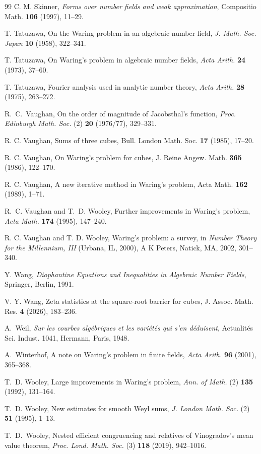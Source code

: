 \documentclass[11pt,letterpaper]{article}
\theoremstyle{definition}
\numberwithin{equation}{section}
\begin{document}
\begin{thebibliography}{99}
C. M. Skinner, \emph{Forms over number fields and weak approximation}, Compositio Math. \textbf{106} (1997), 11--29.

T. Tatuzawa, On the Waring problem in an algebraic number field,
\emph{J. Math. Soc. Japan} \textbf{10} (1958), 322--341.

T. Tatuzawa, On Waring's problem in algebraic number fields,
\emph{Acta Arith.} \textbf{24} (1973), 37--60.

T. Tatuzawa, Fourier analysis used in analytic number theory,
\emph{Acta Arith.} \textbf{28} (1975), 263--272.

R.~C.~Vaughan, On the order of magnitude of Jacobsthal's function,
\emph{Proc. Edinburgh Math. Soc.} (2) \textbf{20} (1976/77), 329--331.

R. C. Vaughan, Sums of three cubes, Bull. London Math. Soc. \textbf{17} (1985), 17--20.

R. C. Vaughan, On Waring's problem for cubes, J. Reine Angew. Math. \textbf{365} (1986), 122--170.

R. C. Vaughan, A new iterative method in Waring's problem, Acta Math. \textbf{162} (1989), 1--71.

R.~C. Vaughan and T.~D. Wooley, Further improvements in Waring's problem,
\emph{Acta Math.} \textbf{174} (1995), 147--240.

R. C. Vaughan and T. D. Wooley, Waring's problem: a survey, in
\emph{Number Theory for the Millennium, III} (Urbana, IL, 2000),
A K Peters, Natick, MA, 2002, 301--340.

Y. Wang, \emph{Diophantine Equations and Inequalities in Algebraic
Number Fields}, Springer, Berlin, 1991.

V. Y. Wang, Zeta statistics at the square-root barrier for cubes, J. Assoc. Math. Res. \textbf{4} (2026), 183--236.

A.~Weil, \emph{Sur les courbes alg\'ebriques et les vari\'et\'es qui s'en d\'eduisent}, Actualit\'es Sci. Indust. 1041, Hermann, Paris, 1948.

A.~Winterhof, A note on Waring's problem in finite fields,
\emph{Acta Arith.} \textbf{96} (2001), 365--368.

T.~D. Wooley, Large improvements in Waring's problem,
\emph{Ann. of Math.} (2) \textbf{135} (1992), 131--164.

T.~D. Wooley, New estimates for smooth Weyl sums,
\emph{J. London Math. Soc.} (2) \textbf{51} (1995), 1--13.

T.~D.~Wooley, Nested efficient congruencing and relatives of Vinogradov's mean value theorem, \emph{Proc. Lond. Math. Soc.} (3) \textbf{118} (2019), 942--1016.

\end{thebibliography}
\end{document}
